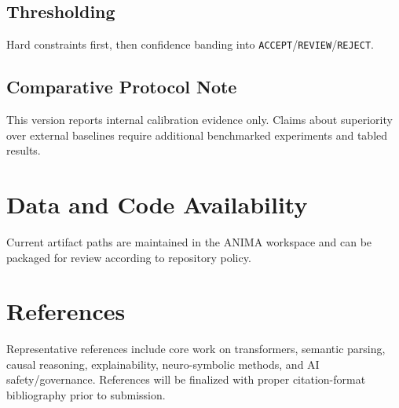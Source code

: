 \documentclass[11pt,a4paper]{article}
\begin{document}
\subsection{Thresholding}
Hard constraints first, then confidence banding into \texttt{ACCEPT}/\texttt{REVIEW}/\texttt{REJECT}.

\subsection{Comparative Protocol Note}
This version reports internal calibration evidence only. Claims about superiority over external baselines require additional benchmarked experiments and tabled results.

\section*{Data and Code Availability}

Current artifact paths are maintained in the ANIMA workspace and can be packaged for review according to repository policy.

\section*{References}

Representative references include core work on transformers, semantic parsing, causal reasoning, explainability, neuro-symbolic methods, and AI safety/governance. References will be finalized with proper citation-format bibliography prior to submission.
\end{document}
